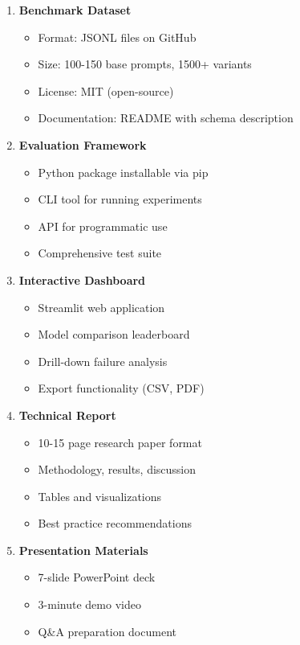 \documentclass[11pt,a4paper]{article}
\begin{document}
\begin{enumerate}[leftmargin=*]
    \item \textbf{Benchmark Dataset}
    \begin{itemize}
        \item Format: JSONL files on GitHub
        \item Size: 100-150 base prompts, 1500+ variants
        \item License: MIT (open-source)
        \item Documentation: README with schema description
    \end{itemize}
    
    \item \textbf{Evaluation Framework}
    \begin{itemize}
        \item Python package installable via pip
        \item CLI tool for running experiments
        \item API for programmatic use
        \item Comprehensive test suite
    \end{itemize}
    
    \item \textbf{Interactive Dashboard}
    \begin{itemize}
        \item Streamlit web application
        \item Model comparison leaderboard
        \item Drill-down failure analysis
        \item Export functionality (CSV, PDF)
    \end{itemize}
    
    \item \textbf{Technical Report}
    \begin{itemize}
        \item 10-15 page research paper format
        \item Methodology, results, discussion
        \item Tables and visualizations
        \item Best practice recommendations
    \end{itemize}
    
    \item \textbf{Presentation Materials}
    \begin{itemize}
        \item 7-slide PowerPoint deck
        \item 3-minute demo video
        \item Q\&A preparation document
    \end{itemize}
\end{enumerate}
\end{document}
